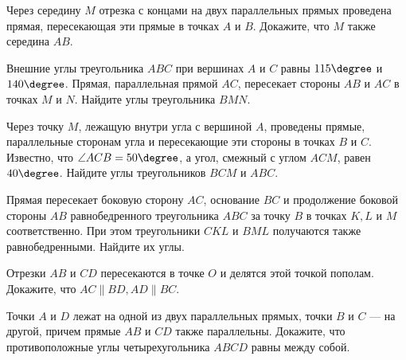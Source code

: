 \begin{class}[number=2]
	\begin{listofex}
		\item Через середину \(M\) отрезка с концами на двух параллельных прямых проведена прямая, пересекающая эти прямые в точках \(A\) и \(B\). Докажите, что \(M\) также середина \(AB\).
		\item Внешние углы треугольника \(ABC\) при вершинах \(A\) и \(C\) равны \(115\degree\) и \(140\degree \). Прямая, параллельная прямой \(AC\), пересекает стороны \(AB\) и \(AC\) в точках \(M\) и \(N\). Найдите углы треугольника \(BMN\).
		\item Через точку \(M\), лежащую внутри угла с вершиной \(A\), проведены прямые, параллельные сторонам угла и пересекающие эти стороны в точках \(B\) и \(C\). Известно, что \(\angle ACB = 50\degree\), а угол, смежный с углом \(ACM\), равен \(40\degree\). Найдите углы треугольников \(BCM\) и \(ABC\).
		\item Прямая пересекает боковую сторону \(AC\), основание \(BC\) и продолжение боковой стороны \(AB\) равнобедренного треугольника \(ABC\) за точку \(B\) в точках \(K, L\) и \(M\) соответственно. При этом треугольники \(CKL\) и \(BML\) получаются также равнобедренными. Найдите их углы.
		\item Отрезки \(AB\) и \(CD\) пересекаются в точке \(O\) и делятся этой точкой пополам. Докажите, что \(AC \parallel BD, AD \parallel BC\).
		\item Точки \(A\) и \(D\) лежат на одной из двух параллельных прямых, точки \(B\) и \(C\) --- на другой, причем прямые \(AB\) и \(CD\) также параллельны. Докажите, что противоположные углы четырехугольника \(ABCD\) равны между собой.
		
	\end{listofex}
\end{class}


